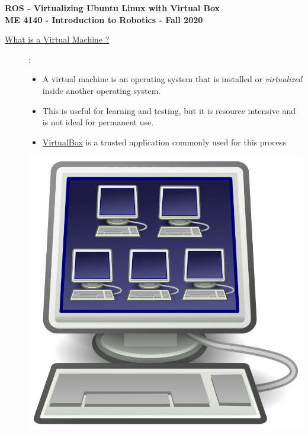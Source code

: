 \documentclass[12pt]{article}
\begin{document}
\thispagestyle{plain}

\begin{center}
   {\bf \Large ROS - Virtualizing Ubuntu Linux with Virtual Box}\vspace{3mm} \\
   {\bf \large ME 4140 - Introduction to Robotics - Fall 2020} \vspace{5mm}\\
\end{center}


\begin{description}

 	\item[\underline{What is a \href{https://en.wikipedia.org/wiki/Virtual_machine}{Virtual Machine} ?}]: \\
 	\begin{multicols}{2}
      		
            \begin{itemize}
                
                \item A virtual machine is an operating system that is installed or {\it virtualized} inside another operating system.
                \item This is useful for learning and testing, but it is resource intensive and is not ideal for permanent use. 
                \item \href{https://www.virtualbox.org/}{VirtualBox} is a trusted application commonly used for this process
                
            \end{itemize}
            \includegraphics[scale=.15]{CaptureA.png}\\
	\end{multicols}
	

\end{description}
\end{document}
